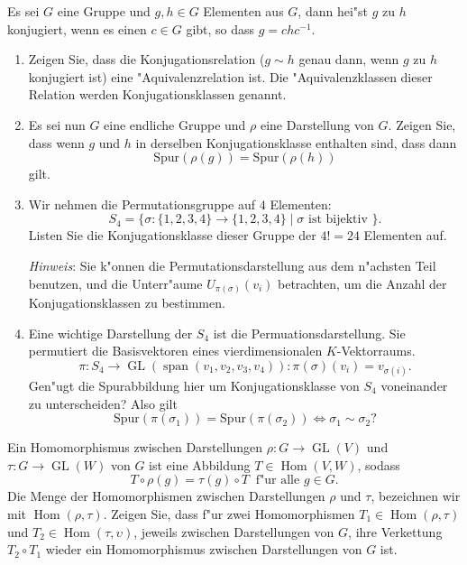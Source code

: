 \documentclass[a4,11pt]{article}
\begin{document}
\begin{aufgabe}[4 Punkte]
Es sei $G$ eine Gruppe und $g,h \in G$ Elementen aus $G$, dann hei"st $g$ zu $h$ konjugiert, wenn es einen $c \in G$ gibt, so dass $g = chc^{-1}$.\begin{enumerate}
\item
Zeigen Sie, dass die Konjugationsrelation ($g \sim h$ genau dann, wenn $g$ zu $h$ konjugiert ist) eine "Aquivalenzrelation ist. Die "Aquivalenzklassen dieser Relation werden Konjugationsklassen genannt.
\item
Es sei nun $G$ eine endliche Gruppe und $\rho$ eine Darstellung von $G$. Zeigen Sie, dass wenn $g$ und $h$ in derselben Konjugationsklasse enthalten sind, dass dann
\[
\text{Spur}(\rho(g)) = \text{Spur}(\rho(h)) 
\]
gilt.
\item
Wir nehmen die Permutationsgruppe auf $4$ Elementen:
\[
S_4 = \{ \sigma : \{ 1,2,3,4 \} \to \{ 1,2,3,4 \} \mid \sigma \text{ ist bijektiv } \}.
\]
Listen Sie die Konjugationsklasse dieser Gruppe der $4! = 24$ Elementen auf.


\emph{Hinweis}: Sie k"onnen die Permutationsdarstellung aus dem n"achsten Teil benutzen, und die Unterr"aume $U_{\pi(\sigma)} (v_i)$ betrachten, um die Anzahl der Konjugationsklassen zu bestimmen.
\item
Eine wichtige Darstellung der $S_4$ ist die Permuationsdarstellung. Sie permutiert die Basisvektoren eines vierdimensionalen $K$-Vektorraums.
\[
\pi : S_4 \to \operatorname{GL}(\operatorname{span}(v_1, v_2, v_3, v_4)) : \pi(\sigma)(v_i) = v_{\sigma(i)}.
\]
Gen"ugt die Spurabbildung hier um Konjugationsklasse von $S_4$ voneinander zu unterscheiden? Also gilt
\[
\text{Spur}(\pi(\sigma_1)) = \text{Spur}(\pi(\sigma_2)) \Leftrightarrow \sigma_1 \sim \sigma_2 ?
\]
\end{enumerate}

\end{aufgabe}

\begin{aufgabe}[4 Punkte]
Ein Homomorphismus zwischen Darstellungen $\rho : G \to \operatorname{GL}(V)$ und $\tau : G \to \operatorname{GL}(W)$ von $G$ ist eine Abbildung $T \in \operatorname{Hom}(V,W)$, sodass
\[
T \circ \rho(g) = \tau(g) \circ T \ \text{ f"ur alle } g \in G.
\]
Die Menge der Homomorphismen zwischen Darstellungen $\rho$ und $\tau$, bezeichnen wir mit $\operatorname{Hom}(\rho, \tau)$.
Zeigen Sie, dass f"ur zwei Homomorphismen $T_1 \in \operatorname{Hom}(\rho, \tau)$ und $T_2 \in \operatorname{Hom}(\tau, \upsilon)$, jeweils zwischen Darstellungen von $G$, ihre Verkettung $T_2 \circ T_1$ wieder ein Homomorphismus zwischen Darstellungen von $G$ ist.
\end{aufgabe}
\end{document}
